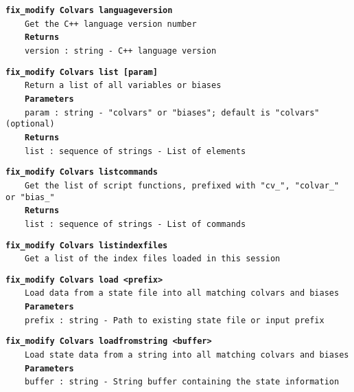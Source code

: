 \begin{mdexampleinput}{}
\texttt{\textbf{fix\_modify Colvars languageversion}}
\\
\-~~~~\texttt{Get the C++ language version number}
\\
\-~~~~\texttt{\textbf{Returns}}
\\
\-~~~~\texttt{version : string - C++ language version}
\end{mdexampleinput}
\begin{mdexampleinput}{}
\texttt{\textbf{fix\_modify Colvars list [param]}}
\\
\-~~~~\texttt{Return a list of all variables or biases}
\\
\-~~~~\texttt{\textbf{Parameters}}
\\
\-~~~~\texttt{param : string - "colvars" or "biases"; default is "colvars" (optional)}
\\
\-~~~~\texttt{\textbf{Returns}}
\\
\-~~~~\texttt{list : sequence of strings - List of elements}
\end{mdexampleinput}
\begin{mdexampleinput}{}
\texttt{\textbf{fix\_modify Colvars listcommands}}
\\
\-~~~~\texttt{Get the list of script functions, prefixed with "cv\_", "colvar\_" or "bias\_"}
\\
\-~~~~\texttt{\textbf{Returns}}
\\
\-~~~~\texttt{list : sequence of strings - List of commands}
\end{mdexampleinput}
\begin{mdexampleinput}{}
\texttt{\textbf{fix\_modify Colvars listindexfiles}}
\\
\-~~~~\texttt{Get a list of the index files loaded in this session}
\end{mdexampleinput}
\begin{mdexampleinput}{}
\texttt{\textbf{fix\_modify Colvars load <prefix>}}
\\
\-~~~~\texttt{Load data from a state file into all matching colvars and biases}
\\
\-~~~~\texttt{\textbf{Parameters}}
\\
\-~~~~\texttt{prefix : string - Path to existing state file or input prefix}
\end{mdexampleinput}
\begin{mdexampleinput}{}
\texttt{\textbf{fix\_modify Colvars loadfromstring <buffer>}}
\\
\-~~~~\texttt{Load state data from a string into all matching colvars and biases}
\\
\-~~~~\texttt{\textbf{Parameters}}
\\
\-~~~~\texttt{buffer : string - String buffer containing the state information}
\end{mdexampleinput}
